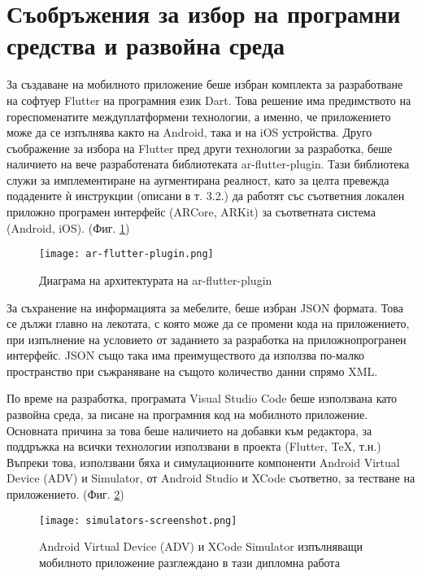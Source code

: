 \section{Съобръжения за избор на програмни средства и развойна среда}
За създаване на мобилното приложение беше избран комплекта за разработване на софтуер Flutter на програмния език Dart. Това решение има предимството на гореспоменатите междуплатформени технологии, а именно, че приложението може да се изпълнява както на Android, така и на iOS устройства. Друго съображение за избора на Flutter пред други технологии за разработка, беше наличието на вече разработената библиотеката ar-flutter-plugin. Тази библиотека служи за имплементиране на аугментирана реалност, като за целта превежда подадените ѝ инструкции (описани в т. 3.2.) да работят със съответния локален приложно програмен интерфейс (ARCore, ARKit) за съответната система (Android, iOS). (Фиг. \ref{fig:ar-flutter-plugin})

\begin{figure}[H]
    \texttt{[image: ar-flutter-plugin.png]}
    \centering
    \caption{Диаграма на архитектурата на ar-flutter-plugin}
    \label{fig:ar-flutter-plugin}
\end{figure}

За съхранение на информацията за мебелите, беше избран JSON формата. Това се дължи главно на лекотата, с която може да се промени кода на приложението, при изпълнение на условието от заданието за разработка на приложнопрогранен интерфейс. JSON също така има преимуществото да използва по-малко пространство при съжраняване на същото количество данни спрямо XML.

По време на разработка, програмата Visual Studio Code беше използвана като развойна среда, за писане на програмния код на мобилното приложение. Основната причина за това беше наличието на добавки към редактора, за поддръжка на всички технологии използвани в проекта (Flutter, TeX, т.н.) Въпреки това, използвани бяха и симулационните компоненти Android Virtual Device (ADV) и Simulator, от Android Studio и XCode съответно, за тестване на приложението. (Фиг. \ref{fig:simulators-screenshot})

\begin{figure}[H]
    \texttt{[image: simulators-screenshot.png]}
    \centering
    \caption{Android Virtual Device (ADV) и XCode Simulator изпълняващи мобилното приложение разглеждано в тази дипломна работа}
    \label{fig:simulators-screenshot}
\end{figure}

